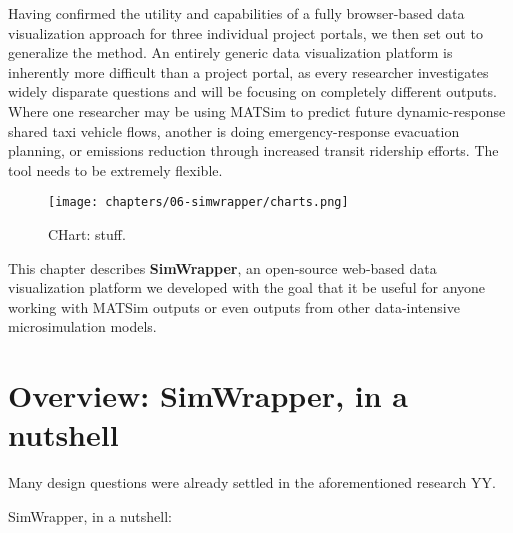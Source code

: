 Having confirmed the utility and capabilities of a fully browser-based
data visualization approach for three individual project portals, we
then set out to generalize the method. An entirely generic data
visualization platform is inherently more difficult than a project
portal, as every researcher investigates widely disparate questions and
will be focusing on completely different outputs. Where one researcher
may be using MATSim to predict future dynamic-response shared taxi
vehicle flows, another is doing emergency-response evacuation planning,
or emissions reduction through increased transit ridership efforts. The
tool needs to be extremely flexible.

\begin{figure}
  \centering
	\begin{minipage}{.75\textwidth}
		\texttt{[image: chapters/06-simwrapper/charts.png]}
		\caption{CHart: stuff.}
		\label{fig:chartychart}
	\end{minipage}
\end{figure}

This chapter describes \textbf{SimWrapper}, an open-source web-based
data visualization platform we developed with the goal that it be useful
for anyone working with MATSim outputs or even outputs from other
data-intensive microsimulation models.

\hypertarget{overview-simwrapper-in-a-nutshell}{%
\section{Overview: SimWrapper, in a
nutshell}\label{overview-simwrapper-in-a-nutshell}}

Many design questions were already settled in the aforementioned
research YY.

SimWrapper, in a nutshell:

